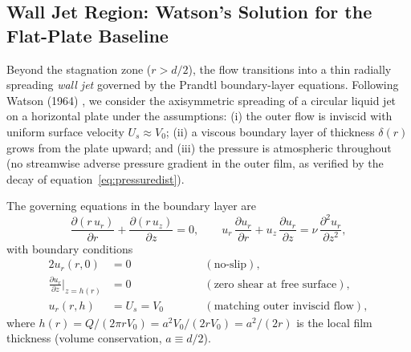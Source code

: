\documentclass[aps,prfluids,reprint,amsmath,amssymb,floatfix]{revtex4-2}
\begin{document}
\subsection{Wall Jet Region: Watson's Solution for the Flat-Plate Baseline}
\label{subsec:watson}

Beyond the stagnation zone ($r > d/2$), the flow transitions into a thin
radially spreading \emph{wall jet} governed by the Prandtl boundary-layer
equations. Following Watson (1964) \citep{Watson1964}, we consider the
axisymmetric spreading of a circular liquid jet on a horizontal plate under
the assumptions: (i) the outer flow is inviscid with uniform surface velocity
$U_s \approx V_0$; (ii) a viscous boundary layer of thickness $\delta(r)$
grows from the plate upward; and (iii) the pressure is atmospheric throughout
(no streamwise adverse pressure gradient in the outer film, as verified
by the decay of equation~\ref{eq:pressuredist}).

The governing equations in the boundary layer are
\begin{equation}
    \frac{\partial(r\,u_r)}{\partial r} + \frac{\partial(r\,u_z)}{\partial z}
    = 0,
    \qquad
    u_r\,\frac{\partial u_r}{\partial r} + u_z\,\frac{\partial u_r}{\partial z}
    = \nu\,\frac{\partial^2 u_r}{\partial z^2},
    \label{eq:BLeqs}
\end{equation}
with boundary conditions
\begin{alignat}{2}
    u_r(r,0) &= 0 &&\qquad (\text{no-slip}),\label{eq:BC1}\\
    \frac{\partial u_r}{\partial z}\bigg|_{z=h(r)} &= 0 &&\qquad
    (\text{zero shear at free surface}),\label{eq:BC2}\\
    u_r(r,h) &= U_s = V_0 &&\qquad (\text{matching outer inviscid flow}),
    \label{eq:BC3}
\end{alignat}
where $h(r) = Q/(2\pi r V_0) = a^2 V_0/(2r V_0) = a^2/(2r)$
is the local film thickness (volume conservation, $a \equiv d/2$).
\end{document}
